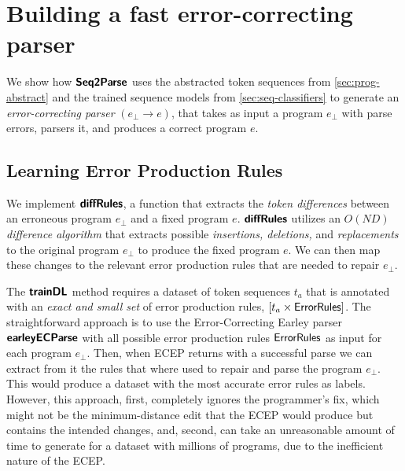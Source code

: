 \section{Building a fast error-correcting parser}
\label{sec:whole-system}

We show how $\bm{\mathsf{Seq2Parse}}$ uses the abstracted token sequences from
\autoref{sec:prog-abstract} and the trained sequence models from
\autoref{sec:seq-classifiers} to generate an \emph{error-correcting parser}
$(e_{\bot} \to e)$, that takes as input a program $e_{\bot}$ with parse errors,
parsers it, and produces a correct program $e$.


\subsection{Learning Error Production Rules}
\label{sec:whole-system:error-rules}
We implement $\bm{\mathsf{diffRules}}$, a function that extracts the \emph{token differences}
between an erroneous program $e_{\bot}$ and a fixed program $e$. $\bm{\mathsf{diffRules}}$
utilizes an \emph{$O(ND)$ difference algorithm} \citep{Myers_1986} that extracts
possible \emph{insertions, deletions,} and \emph{replacements} to the original
program $e_{\bot}$ to produce the fixed program $e$. We can then map these
changes to the relevant error production rules that are needed to repair
$e_{\bot}$.

The $\bm{\mathsf{trainDL}}$ method requires a dataset of token sequences $t_a$ that is
annotated with an \emph{exact and small set} of error production rules, \ie
$[t_a \times \mathsf{ErrorRules}]$. The straightforward approach is to use the
Error-Correcting Earley parser $\bm{\mathsf{earleyECParse}}$ with all possible error production
rules $\mathsf{ErrorRules}$ as input for each program $e_{\bot}$. Then, when ECEP
returns with a successful parse we can extract from it the rules that where used
to repair and parse the program $e_{\bot}$. This would produce a dataset with
the most accurate error rules as labels. However, this approach, first,
completely ignores the programmer's fix, which might not be the minimum-distance
edit that the ECEP would produce but contains the intended changes, and, second,
can take an unreasonable amount of time to generate for a dataset with millions
of programs, due to the inefficient nature of the ECEP.

